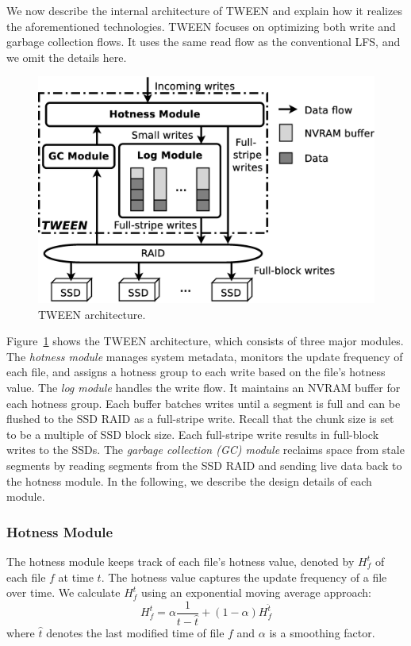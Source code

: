 We now describe the internal architecture of TWEEN and explain how it
realizes the aforementioned technologies.  TWEEN focuses on optimizing both
write and garbage collection flows.  It uses the same read flow as the
conventional LFS, and we omit the details here. 

\begin{figure}[t]
    \centering
    \includegraphics[width=0.7\linewidth]{figs/ssdraid_arch_2}
    \caption{TWEEN architecture.}
    \label{fig:tween_architecture}
\end{figure}

Figure~\ref{fig:tween_architecture} shows the TWEEN architecture, which consists of
three major modules. The \textit{hotness module} manages system metadata,
monitors the update frequency of each file, and assigns a hotness group to
each write based on the file's hotness value.  The \textit{log module} handles
the write flow.  It maintains an NVRAM buffer for each hotness group. Each
buffer batches writes until a segment is full and can be flushed to the
SSD RAID as a full-stripe write. Recall that the chunk size is set to be 
a multiple of SSD block size. Each full-stripe write results in full-block writes to the
SSDs.  The \textit{garbage collection (GC) module} reclaims space 
from stale segments by reading segments from the SSD
RAID and sending live data back to the hotness module. In the following, we describe the
design details of each module. 

\subsubsection{Hotness Module}
\label{subsubsec:hotmod}

The hotness module keeps track of each file's hotness value, denoted by
$H_{f}^{t}$ of each file $f$ at time $t$.  The hotness value captures the
update frequency of a file over time. 
We calculate $H_{f}^{t}$ using an exponential moving average approach:
$$
H_{f}^{t} = \alpha\frac{1}{t-\hat{t}} + (1-\alpha)H_{f}^{\hat{t}}
$$
where $\hat{t}$ denotes the last modified time of file $f$ and 
$\alpha$ is a smoothing factor.

